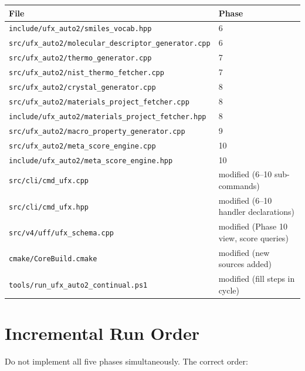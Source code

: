\documentclass[11pt, a4paper]{article}
\begin{document}
\begin{center}
\begin{tabular}{ll}
\toprule
\textbf{File} & \textbf{Phase} \\
\midrule
\texttt{include/ufx\_auto2/smiles\_vocab.hpp}                   & 6 \\
\texttt{src/ufx\_auto2/molecular\_descriptor\_generator.cpp}     & 6 \\
\texttt{src/ufx\_auto2/thermo\_generator.cpp}                    & 7 \\
\texttt{src/ufx\_auto2/nist\_thermo\_fetcher.cpp}                & 7 \\
\texttt{src/ufx\_auto2/crystal\_generator.cpp}                   & 8 \\
\texttt{src/ufx\_auto2/materials\_project\_fetcher.cpp}          & 8 \\
\texttt{include/ufx\_auto2/materials\_project\_fetcher.hpp}      & 8 \\
\texttt{src/ufx\_auto2/macro\_property\_generator.cpp}           & 9 \\
\texttt{src/ufx\_auto2/meta\_score\_engine.cpp}                  & 10 \\
\texttt{include/ufx\_auto2/meta\_score\_engine.hpp}              & 10 \\
\midrule
\texttt{src/cli/cmd\_ufx.cpp}  & modified (6--10 sub-commands) \\
\texttt{src/cli/cmd\_ufx.hpp}  & modified (6--10 handler declarations) \\
\texttt{src/v4/uff/ufx\_schema.cpp} & modified (Phase 10 view, score queries) \\
\texttt{cmake/CoreBuild.cmake} & modified (new sources added) \\
\texttt{tools/run\_ufx\_auto2\_continual.ps1} & modified (fill steps in cycle) \\
\bottomrule
\end{tabular}
\end{center}

\section{Incremental Run Order}

Do not implement all five phases simultaneously.  The correct order:
\end{document}

